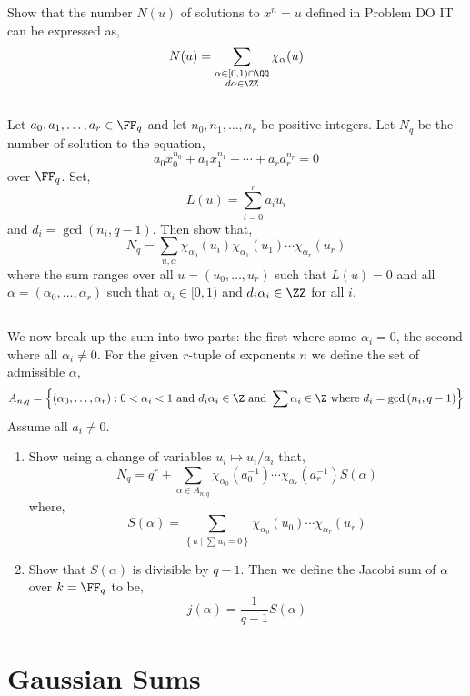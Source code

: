 \documentclass[12pt]{article}
\begin{document}
Show that the number $N(u)$ of solutions to $x^n = u$ defined in Problem DO IT can be expressed as,
\[ N(u) = \sum_{\substack{ \alpha \in [0,1) \cap \QQ \\ 
d \alpha \in \ZZ }} \chi_{\alpha}(u) \]

\subsection{}

Let $a_0, a_1, \dots, a_r \in \FF_q$ and let $n_0, n_1, \dots, n_r$ be positive integers. Let $N_q$ be the number of solution to the equation,
\[ a_0 x_0^{n_0} + a_1 x_1^{n_1} + \cdots + a_r a_r^{n_r} = 0 \]
over $\FF_q$. Set,
\[ L(u) = \sum_{i = 0}^r a_i u_i \]
and $d_i = \gcd(n_i, q-1)$. Then show that,
\[ N_q = \sum_{u, \alpha} \chi_{\alpha_0}(u_i) \chi_{\alpha_1}(u_1) \cdots \chi_{\alpha_r}(u_r) \]
where the sum ranges over all $u = (u_0, \dots, u_r)$ such that $L(u) = 0$ and all $\alpha = (\alpha_0, \dots, \alpha_r)$ such that $\alpha_i \in [0,1)$ and $d_i \alpha_i \in \ZZ$ for all $i$.

\subsection{}

We now break up the sum into two parts: the first where some $\alpha_i = 0$, the second where all $\alpha_i \neq 0$. For the given $r$-tuple of exponents $n$ we define the set of admissible $\alpha$,
\[ A_{n, q} = \left\{ (\alpha_0, \dots, \alpha_r) : 0 < \alpha_i < 1 \text{ and } d_i \alpha_i \in \Z \text{ and } \sum \alpha_i \in \Z \text{ where } d_i = \gcd{(n_i, q-1)} \right\} \]
Assume all $a_i \neq 0$. 
\begin{enumerate}
\item Show using a change of variables $u_i \mapsto u_i / a_i$ that,
\[ N_q = q^r + \sum_{\alpha \in A_{n,q}} \chi_{\alpha_0}(a_0^{-1}) \cdots \chi_{\alpha_r}(a_r^{-1}) S(\alpha) \]
where,
\[ S(\alpha) = \sum_{\left\{ u \middle| \sum u_i = 0 \right\}} \chi_{\alpha_0}(u_0) \cdots \chi_{\alpha_r}(u_r) \]

\item Show that $S(\alpha)$ is divisible by $q-1$. Then we define the Jacobi sum of $\alpha$ over $k = \FF_q$ to be,
\[ j(\alpha) = \frac{1}{q-1} S(\alpha) \]
\end{enumerate}


\section{Gaussian Sums} 
\end{document}
